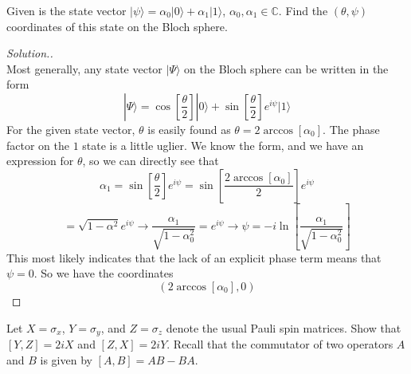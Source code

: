 \documentclass[12pt]{article}
\newenvironment{problem}[2][Problem]{\begin{trivlist}
\item[\hskip \labelsep {\bfseries #1}\hskip \labelsep {\bfseries #2.}]}{\end{trivlist}}
\begin{document}
\begin{problem}{C1}
Given is the state vector $|\psi\rangle=\alpha_0|0\rangle+\alpha_1|1\rangle$, $\alpha_0,\alpha_1\in\mathbb{C}$. Find the $(\theta,\psi)$ coordinates of this state on the Bloch sphere. 
\end{problem}
 
\begin{proof}[Solution.]~\\
Most generally, any state vector $|\Psi\rangle$ on the Bloch sphere can be written in the form
$$|\Psi\rangle=\cos\left[\frac{\theta}{2}\right]|0\rangle+\sin\left[\frac{\theta}{2}\right]e^{i\psi}|1\rangle$$
For the given state vector, $\theta$ is easily found as $\theta=2\arccos[\alpha_0]$. The phase factor on the $1$
state is a little uglier. We know the form, and we have an expression for $\theta$, so we can directly see that
$$\alpha_1=\sin\left[\frac{\theta}{2}\right]e^{i\psi}=\sin\left[\frac{2\arccos[\alpha_0]}{2}\right]e^{i\psi}$$
$$=\sqrt{1-\alpha^2}e^{i\psi}\to\frac{\alpha_1}{\sqrt{1-\alpha_0^2}}=e^{i\psi}\to\psi=-i\ln\left[\frac{\alpha_1}{\sqrt{1-\alpha_0^2}}\right]$$
This most likely indicates that the lack of an explicit phase term means that $\psi=0$. So we have the
coordinates
$$(2\arccos[\alpha_0],0)$$
\end{proof}

\begin{problem}{C2}
Let $X=\sigma_x$, $Y=\sigma_y$, and $Z=\sigma_z$ denote the usual Pauli spin matrices. Show that $[Y,Z]=2iX$ and $[Z,X]=2iY$. Recall that the commutator of two operators $A$ and $B$ is given by $[A,B]=AB-BA$.
\end{problem}
\end{document}
